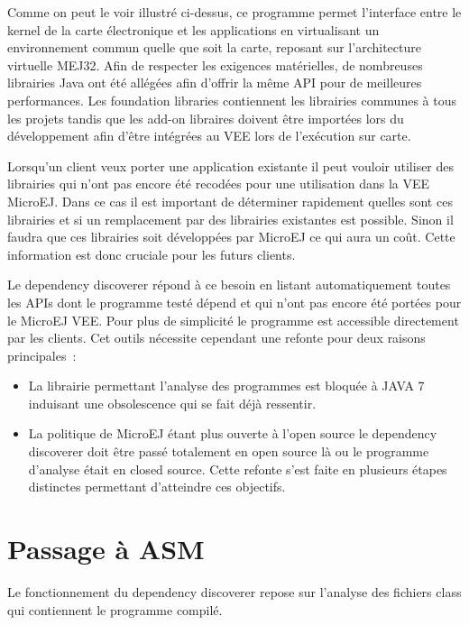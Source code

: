 \documentclass[french,a4paper,12pt]{report}
\begin{document}
 Comme on peut le voir illustré ci-dessus, ce programme permet l’interface entre le kernel de la carte électronique et les applications en virtualisant un environnement commun quelle que soit la carte, reposant sur l’architecture virtuelle MEJ32. Afin de respecter les exigences matérielles, de nombreuses librairies Java ont été allégées afin d’offrir la même API pour de meilleures performances. Les foundation libraries contiennent les librairies communes à tous les projets tandis que les add-on libraires doivent être importées lors du développement afin d’être intégrées au VEE lors de l’exécution sur carte.

Lorsqu’un client veux porter une application existante il peut vouloir utiliser des librairies qui n’ont pas encore été recodées pour une utilisation dans la VEE MicroEJ. Dans ce cas il est important de déterminer rapidement quelles sont ces librairies et si un remplacement par des librairies existantes est possible. Sinon il faudra que ces librairies soit développées par MicroEJ ce qui aura un coût. Cette information est donc cruciale pour les futurs clients.
 
Le dependency discoverer répond à ce besoin en listant automatiquement toutes les APIs dont le programme testé dépend et qui n’ont pas encore été portées pour le MicroEJ VEE. Pour plus de simplicité le programme est accessible directement par les clients. Cet outils nécessite cependant une refonte pour deux raisons principales :
\begin{itemize}

\item La librairie permettant l’analyse des programmes est bloquée à JAVA 7 induisant une obsolescence qui se fait déjà ressentir.

\item La politique de MicroEJ étant plus ouverte à l’open source le dependency discoverer doit être passé totalement en open source là ou le programme d’analyse était en closed source.
Cette refonte s’est faite en plusieurs étapes distinctes permettant d’atteindre ces objectifs.

\end{itemize}

\section{Passage à ASM }

Le fonctionnement du dependency discoverer repose sur l'analyse des fichiers class qui contiennent le programme compilé. 
\end{document}
